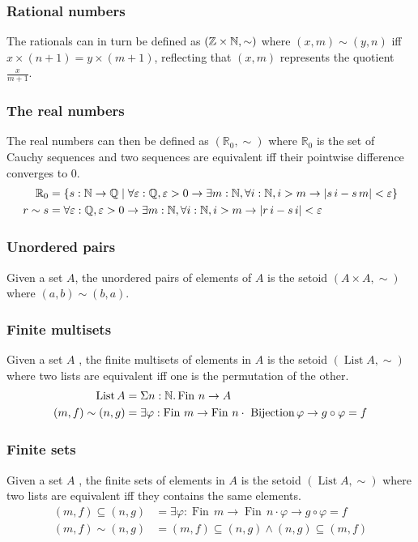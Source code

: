 \documentclass{llncs}
\DeclareMathOperator*{\List}{\mathrm{List}}
\DeclareMathOperator*{\Fin}{\mathrm{Fin}}
\newcommand{\Z}{\mathbb{Z}}
\newcommand{\RZ}{\mathbb{R}_0}
\begin{document}
\subsubsection*{Rational numbers}
The rationals can in turn be defined as $(\Z\times\nat,\sim)$ where $(x,m)\sim(y,n)$ if{f} $x\times(n+1)=y\times(m+1)$, reflecting that $(x,m)$ represents the quotient $\frac {x}{m+1}$.
\subsubsection*{The real numbers}
The real numbers can then be defined as $(\RZ,\sim)$ where $\RZ$ is the set of Cauchy sequences and two sequences are equivalent if{f} their pointwise difference converges to $0$. 
\begin{align*}
\RZ&=\set{s : \nat\to\Q \mid \forall\varepsilon :\Q,\varepsilon>0\to\exists m:\nat, \forall i:\nat, i>m\to |s\,i - s\, m|<\varepsilon}\\
r\sim s &= \forall\varepsilon :\Q,\varepsilon>0\to\exists m:\nat, \forall i:\nat, i>m\to |r\,i - s\,i|<\varepsilon
\end{align*}

\subsubsection*{Unordered pairs}
Given a set $A$, the unordered pairs of elements of $A$ is the setoid $(A\times A,\sim)$ where
$(a,b)\sim(b,a)$.

\subsubsection*{Finite multisets}
Given a set $A$ , the finite multisets of elements in $A$ is the setoid $(\List A,\sim)$ where two lists are equivalent if{f} one is the permutation of the other.
\begin{align*}
\List A &= \Sigma n:\nat.\Fin\,n\to A\\
(m,f)\sim(n,g) &= \exists \varphi : \Fin\,m \to \Fin\,n \cdot\ \mathrm{Bijection}\,\varphi \to g\circ\varphi = f  
\end{align*}

\subsubsection*{Finite sets}
Given a set $A$ , the finite sets of elements in $A$ is the setoid $(\List A,\sim)$ where two lists are equivalent if{f} they contains the same elements.
\begin{align*}
(m,f)\subseteq(n,g) &= \exists \varphi : \Fin\,m \to \Fin\,n \cdot \varphi \to g\circ\varphi = f  \\
(m,f)\sim(n,g)&= (m,f)\subseteq(n,g) \wedge (n,g)\subseteq(m,f)
\end{align*}
\end{document}
